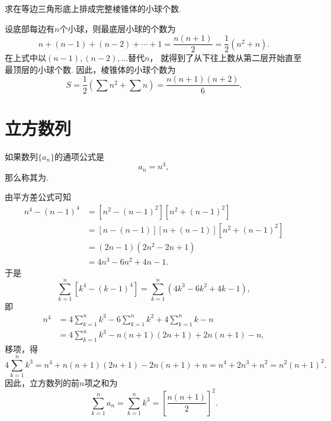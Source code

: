 \begin{example}
求在等边三角形底上排成完整棱锥体的小球个数.
\begin{solution}
设底部每边有\(n\)个小球，则最底层小球的个数为\begin{equation*}
    n+(n-1)+(n-2)+\dotsb+1
    = \frac{n(n+1)}{2}
    = \frac{1}{2}(n^2+n).
\end{equation*}
在上式中以\((n-1),(n-2),\dotsc\)替代\(n\)，
就得到了从下往上数从第二层开始直至最顶层的小球个数.
因此，棱锥体的小球个数为\begin{equation*}
    S = \frac{1}{2} (\sum n^2 + \sum n)
    = \frac{n(n+1)(n+2)}{6}.
\end{equation*}
\end{solution}
\end{example}

\section{立方数列}
如果数列\(\{a_n\}\)的通项公式是\begin{equation*}
a_n = n^3,
\end{equation*}那么称其为.

由平方差公式可知
\begin{equation*}\begin{aligned}
n^4 - (n-1)^4
&= [n^2 - (n-1)^2] [n^2 + (n-1)^2] \\
&= [n - (n-1)] [n + (n-1)] [n^2 + (n-1)^2] \\
&= (2n-1) (2n^2 - 2n + 1) \\
&= 4n^3 - 6n^2 + 4n - 1.
\end{aligned}\end{equation*}
于是\begin{equation*}
\sum_{k=1}^n [k^4 - (k-1)^4]
= \sum_{k=1}^n (4k^3 - 6k^2 + 4k - 1),
\end{equation*}即\begin{equation*}\begin{aligned}
n^4
&= 4 \sum_{k=1}^n k^3 - 6 \sum_{k=1}^n k^2 + 4 \sum_{k=1}^n k - n \\
&= 4 \sum_{k=1}^n k^3 - n(n+1)(2n+1) + 2n(n+1) - n,
\end{aligned}\end{equation*}
移项，得\begin{equation*}
4 \sum_{k=1}^n k^3
= n^4 + n(n+1)(2n+1) - 2n(n+1) + n
= n^4 + 2n^3 + n^2
= n^2(n+1)^2.
\end{equation*}
因此，立方数列的前\(n\)项之和为
\begin{equation}
\sum_{k=1}^n a_n
= \sum_{k=1}^n k^3
= \left[\frac{n(n+1)}{2}\right]^2.
\end{equation}

